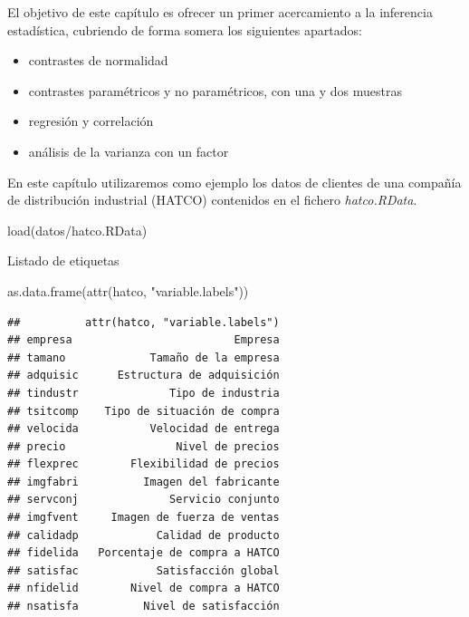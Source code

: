 \documentclass[
]{book}
\newenvironment{Shaded}{\begin{snugshade}}{\end{snugshade}}
\newcommand{\FunctionTok}[1]{\textcolor[rgb]{0.00,0.00,0.00}{#1}}
\newcommand{\NormalTok}[1]{#1}
\newcommand{\StringTok}[1]{\textcolor[rgb]{0.31,0.60,0.02}{#1}}
\providecommand{\tightlist}{%
  \setlength{\itemsep}{0pt}\setlength{\parskip}{0pt}}
\theoremstyle{break}
\theoremstyle{nonumberplain}
\begin{document}
El objetivo de este capítulo es ofrecer un primer acercamiento a la inferencia estadística,
cubriendo de forma somera los siguientes apartados:

\begin{itemize}
\tightlist
\item
  contrastes de normalidad
\item
  contrastes paramétricos y no paramétricos, con una y dos muestras
\item
  regresión y correlación
\item
  análisis de la varianza con un factor
\end{itemize}

En este capítulo utilizaremos como ejemplo los datos de clientes de una compañía de distribución industrial (HATCO)
contenidos en el fichero \emph{hatco.RData}.

\begin{Shaded}
\begin{Highlighting}[]
\FunctionTok{load}\NormalTok{(}\StringTok{\textquotesingle{}datos/hatco.RData\textquotesingle{}}\NormalTok{)}
\end{Highlighting}
\end{Shaded}

Listado de etiquetas

\begin{Shaded}
\begin{Highlighting}[]
\FunctionTok{as.data.frame}\NormalTok{(}\FunctionTok{attr}\NormalTok{(hatco, }\StringTok{"variable.labels"}\NormalTok{))}
\end{Highlighting}
\end{Shaded}

\begin{verbatim}
##          attr(hatco, "variable.labels")
## empresa                         Empresa
## tamano             Tamaño de la empresa
## adquisic      Estructura de adquisición
## tindustr              Tipo de industria
## tsitcomp    Tipo de situación de compra
## velocida           Velocidad de entrega
## precio                 Nivel de precios
## flexprec        Flexibilidad de precios
## imgfabri          Imagen del fabricante
## servconj              Servicio conjunto
## imgfvent     Imagen de fuerza de ventas
## calidadp            Calidad de producto
## fidelida   Porcentaje de compra a HATCO
## satisfac            Satisfacción global
## nfidelid        Nivel de compra a HATCO
## nsatisfa          Nivel de satisfacción
\end{verbatim}
\end{document}
